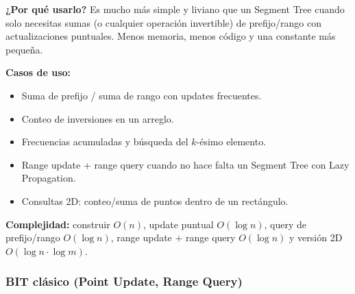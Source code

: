 \documentclass[10pt,a4paper,twocolumn]{article}
\begin{document}
\textbf{¿Por qué usarlo?} Es mucho más simple y liviano que un Segment
Tree cuando solo necesitas sumas (o cualquier operación invertible)
de prefijo/rango con actualizaciones puntuales. Menos memoria, menos
código y una constante más pequeña.

\textbf{Casos de uso:}

\begin{itemize}
    \item Suma de prefijo / suma de rango con updates frecuentes.
    \item Conteo de inversiones en un arreglo.
    \item Frecuencias acumuladas y búsqueda del $k$-ésimo elemento.
    \item Range update + range query cuando no hace falta un Segment
    Tree con Lazy Propagation.
    \item Consultas 2D: conteo/suma de puntos dentro de un rectángulo.
\end{itemize}

\textbf{Complejidad:} construir $O(n)$, update puntual $O(\log n)$,
query de prefijo/rango $O(\log n)$, range update + range query
$O(\log n)$ y versión 2D $O(\log n \cdot \log m)$.


\subsubsection{BIT clásico (Point Update, Range Query)}
\end{document}

